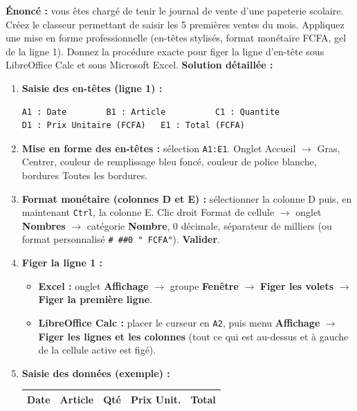 \documentclass[11pt]{article}
\begin{document}
\begin{exoresolu}
\textbf{Énoncé :} vous êtes chargé de tenir le journal de vente d'une papeterie scolaire. Créez le classeur permettant de saisir les 5 premières ventes du mois. Appliquez une mise en forme professionnelle (en-têtes stylisés, format monétaire FCFA, gel de la ligne 1). Donnez la procédure exacte pour figer la ligne d'en-tête sous LibreOffice Calc et sous Microsoft Excel.
\tcblower
\textbf{Solution détaillée :}
\begin{enumerate}
    \item \textbf{Saisie des en-têtes (ligne 1) :}
    \begin{lstlisting}
A1 : Date        B1 : Article          C1 : Quantite
D1 : Prix Unitaire (FCFA)   E1 : Total (FCFA)
    \end{lstlisting}
    \item \textbf{Mise en forme des en-têtes :} sélection \texttt{A1:E1}. Onglet Accueil $\rightarrow$ Gras, Centrer, couleur de remplissage bleu foncé, couleur de police blanche, bordures \og{}Toutes les bordures\fg{}.
    \item \textbf{Format monétaire (colonnes D et E) :} sélectionner la colonne D puis, en maintenant \texttt{Ctrl}, la colonne E. Clic droit \og{}Format de cellule\fg{} $\rightarrow$ onglet \textbf{Nombres} $\rightarrow$ catégorie \textbf{Nombre}, 0 décimale, séparateur de milliers (ou format personnalisé \texttt{\# \#\#0 " FCFA"}). \textbf{Valider}.
    \item \textbf{Figer la ligne 1 :}
    \begin{itemize}
        \item \textbf{Excel :} onglet \textbf{Affichage} $\rightarrow$ groupe \textbf{Fenêtre} $\rightarrow$ \textbf{Figer les volets} $\rightarrow$ \textbf{Figer la première ligne}.
        \item \textbf{LibreOffice Calc :} placer le curseur en \texttt{A2}, puis menu \textbf{Affichage} $\rightarrow$ \textbf{Figer les lignes et les colonnes} (tout ce qui est au-dessus et à gauche de la cellule active est figé).
    \end{itemize}
    \item \textbf{Saisie des données (exemple) :}
    \begin{center}
    \begin{tabularx}{\linewidth}{|l|X|c|r|r|}\hline
    \rowcolor{popblueL} \textbf{Date} & \textbf{Article} & \textbf{Qté} & \textbf{Prix Unit.} & \textbf{Total} \\\hline

\end{tabularx}
\end{center}
\end{enumerate}
\end{exoresolu}
\end{document}
